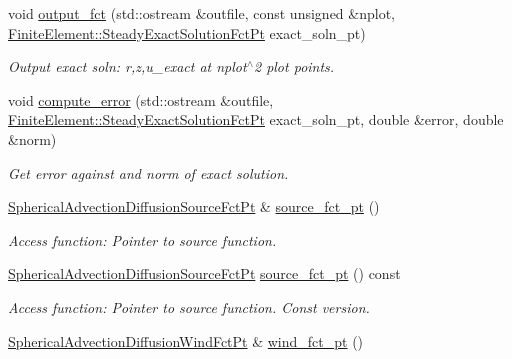 \begin{DoxyCompactItemize}
void \hyperlink{classoomph_1_1SphericalAdvectionDiffusionEquations_a2fcb664a740cfb2a645b0e1893a00773}{output\+\_\+fct} (std\+::ostream \&outfile, const unsigned \&nplot, \hyperlink{classoomph_1_1FiniteElement_a690fd33af26cc3e84f39bba6d5a85202}{Finite\+Element\+::\+Steady\+Exact\+Solution\+Fct\+Pt} exact\+\_\+soln\+\_\+pt)
\begin{DoxyCompactList}\small\item\em Output exact soln\+: r,z,u\+\_\+exact at nplot$^\wedge$2 plot points. \end{DoxyCompactList}\item 
void \hyperlink{classoomph_1_1SphericalAdvectionDiffusionEquations_a92998bc7fd574a8e0bb6afe3694fb62b}{compute\+\_\+error} (std\+::ostream \&outfile, \hyperlink{classoomph_1_1FiniteElement_a690fd33af26cc3e84f39bba6d5a85202}{Finite\+Element\+::\+Steady\+Exact\+Solution\+Fct\+Pt} exact\+\_\+soln\+\_\+pt, double \&error, double \&norm)
\begin{DoxyCompactList}\small\item\em Get error against and norm of exact solution. \end{DoxyCompactList}\item 
\hyperlink{classoomph_1_1SphericalAdvectionDiffusionEquations_aa02d787c43f88e46ad5e21c7b299b5cb}{Spherical\+Advection\+Diffusion\+Source\+Fct\+Pt} \& \hyperlink{classoomph_1_1SphericalAdvectionDiffusionEquations_a9895841883dedbbc00fb1fc51ad0493e}{source\+\_\+fct\+\_\+pt} ()
\begin{DoxyCompactList}\small\item\em Access function\+: Pointer to source function. \end{DoxyCompactList}\item 
\hyperlink{classoomph_1_1SphericalAdvectionDiffusionEquations_aa02d787c43f88e46ad5e21c7b299b5cb}{Spherical\+Advection\+Diffusion\+Source\+Fct\+Pt} \hyperlink{classoomph_1_1SphericalAdvectionDiffusionEquations_a9c4d749b66acb943eac37478584683aa}{source\+\_\+fct\+\_\+pt} () const
\begin{DoxyCompactList}\small\item\em Access function\+: Pointer to source function. Const version. \end{DoxyCompactList}\item 
\hyperlink{classoomph_1_1SphericalAdvectionDiffusionEquations_adef9c036e9f80c134078d8d78049199e}{Spherical\+Advection\+Diffusion\+Wind\+Fct\+Pt} \& \hyperlink{classoomph_1_1SphericalAdvectionDiffusionEquations_ae3d7908aae79d3eae5ba6e1bb638498b}{wind\+\_\+fct\+\_\+pt} ()

\end{DoxyCompactItemize}
